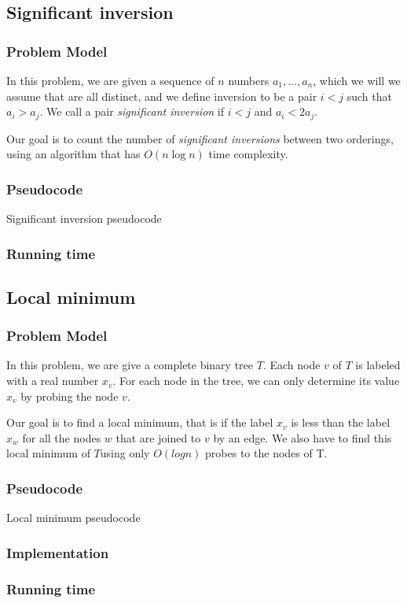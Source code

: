 \documentclass{article}
\begin{document}
\subsection*{Significant inversion}

\subsubsection*{Problem Model}

In this problem, we are given a sequence of $n$ numbers $a_1,...,a_n$, which we will we assume that are all distinct, and we define inversion to be a pair $i<j$ such that $a_i>a_j$. We call a pair \textit{significant inversion} if $i<j$ and $a_i<2a_j$.

Our goal is to count the number of \textit{significant inversions} between two orderings, using an algorithm that has $O(n \log n)$ time complexity.

\subsubsection*{Pseudocode}

\begin{algorithm}[H]
\caption{Significant inversion pseudocode}
\begin{algorithmic}[1]
\end{algorithmic}
\end{algorithm}

\subsubsection*{Running time}


\subsection*{Local minimum}

\subsubsection*{Problem Model}

In this problem, we are give a complete binary tree $T$. Each node $v$ of $T$ is labeled with a real number $x_v$. For each node in the tree, we can only determine its value $x_v$ by probing the node $v$.

Our goal is to find a local minimum, that is if the label $x_v$ is less than the label $x_w$ for all the nodes $w$ that are joined to $v$ by an edge.  We also have to find this local minimum of $T$using only $O(log n)$ probes to the nodes of T.

\subsubsection*{Pseudocode}

\begin{algorithm}[H]
\caption{Local minimum pseudocode}
\begin{algorithmic}[1]
\end{algorithmic}
\end{algorithm}

\subsubsection*{Implementation}

\subsubsection*{Running time}
\end{document}
